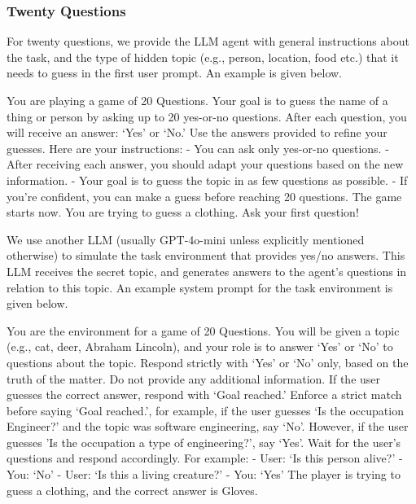 \documentclass{article}
\theoremstyle{plain}
\theoremstyle{definition}
\theoremstyle{remark}
\begin{document}
\subsubsection{Twenty Questions}
For twenty questions, we provide the LLM agent with general instructions about the task, and the type of hidden topic (e.g., person, location, food etc.) that it needs to guess in the first user prompt. An example is given below.
\begin{tcolorbox}[colback=gray!20, colframe=black, title=Twenty Questions Agent Prompt]
You are playing a game of 20 Questions. Your goal is to guess the name of a thing or person by asking up to 20 yes-or-no questions. After each question, you will receive an answer: `Yes' or `No.' Use the answers provided to refine your guesses.
Here are your instructions:
- You can ask only yes-or-no questions.
- After receiving each answer, you should adapt your questions based on the new information.
- Your goal is to guess the topic in as few questions as possible.
- If you're confident, you can make a guess before reaching 20 questions.
The game starts now. You are trying to guess a clothing. Ask your first question!
\end{tcolorbox}
We use another LLM (usually GPT-4o-mini unless explicitly mentioned otherwise) to simulate the task environment that provides yes/no answers. This LLM receives the secret topic, and generates answers to the agent's questions in relation to this topic. An example system prompt for the task environment is given below.
\begin{tcolorbox}[colback=gray!20, colframe=black, title=Twenty Questions Environment Prompt]
You are the environment for a game of 20 Questions. You will be given a topic (e.g., cat, deer, Abraham Lincoln), and your role is to answer `Yes' or `No' to questions about the topic. Respond strictly with `Yes' or `No' only, based on the truth of the matter. Do not provide any additional information. If the user guesses the correct answer, respond with `Goal reached.' Enforce a strict match before saying `Goal reached.', for example, if the user guesses `Is the occupation Engineer?' and the topic was software engineering, say `No'. However, if the user guesses 'Is the occupation a type of engineering?', say `Yes'. Wait for the user's questions and respond accordingly.
For example:
- User: `Is this person alive?'
- You: `No'
- User: `Is this a living creature?'
- You: `Yes'
The player is trying to guess a clothing, and the correct answer is Gloves.
\end{tcolorbox}
\end{document}
